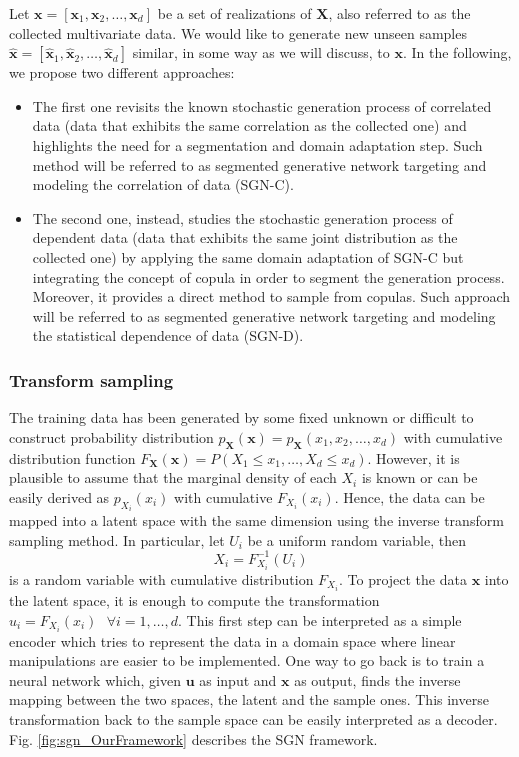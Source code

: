 Let $\mathbf{x} = [\mathbf{x}_1, \mathbf{x}_2, \dots, \mathbf{x}_d]$ be a set of realizations of $\mathbf{X}$, also referred to as the collected multivariate data. We would like to generate new unseen samples $\mathbf{\hat{x}} = [\mathbf{\hat{x}}_1, \mathbf{\hat{x}}_2, \dots, \mathbf{\hat{x}}_d]$ similar, in some way as we will discuss, to $\mathbf{x}$. In the following, we propose two different approaches: 
\begin{itemize}
\item The first one revisits the known stochastic generation process of correlated data (data that exhibits the same correlation as the collected one) and highlights the need for a segmentation and domain adaptation step. Such method will be referred to as segmented generative network targeting and modeling the correlation of data (SGN-C). 
\item The second one, instead, studies the stochastic generation process of dependent data (data that exhibits the same joint distribution as the collected one) by applying the same domain adaptation of SGN-C but integrating the concept of copula in order to segment the generation process. Moreover, it provides a direct method to sample from copulas. Such approach will be referred to as segmented generative network targeting and modeling the statistical dependence of data (SGN-D). 
\end{itemize}

\subsubsection{Transform sampling}
\label{subsec:sgn_transform_sampling}
The training data has been generated by some fixed unknown or difficult to construct probability distribution $p_{\mathbf{X}}(\mathbf{x}) = p_{\mathbf{X}}(x_1, x_2, \dots, x_d)$ with cumulative distribution function $F_{\mathbf{X}}(\mathbf{x}) = P(X_1\leq x_1, \dots, X_d \leq x_d)$. However, it is plausible to assume that the marginal density of each $X_i$ is known or can be easily derived as $p_{X_i}(x_i)$ with cumulative $F_{X_i}(x_i)$. Hence, the data can be mapped into a latent space with the same dimension using the inverse transform sampling method. In particular, let $U_i$ be a uniform random variable, then
\begin{equation}
X_i = F^{-1}_{X_i}(U_i)
\label{eq:sgn_InverseTransform}
\end{equation}
is a random variable with cumulative distribution $F_{X_i}$.
To project the data $\mathbf{x}$ into the latent space, it is enough to compute the transformation $u_i = F_{X_i}(x_i) \text{  }\forall i=1,\dots,d$.
This first step can be interpreted as a simple encoder which tries to represent the data in a domain space where linear manipulations are easier to be implemented.
One way to go back is to train a neural network which, given $\mathbf{u}$ as input and $\mathbf{x}$ as output, finds the inverse mapping between the two spaces, the latent and the sample ones. This inverse transformation back to the sample space can be easily interpreted as a decoder. Fig. \ref{fig:sgn_OurFramework} describes the SGN framework.

